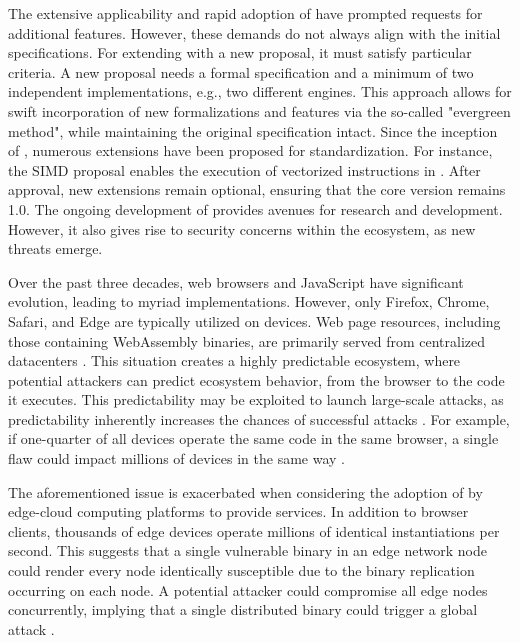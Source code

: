 The extensive applicability and rapid adoption of \Wasm have prompted requests for additional features. 
However, these demands do not always align with the initial specifications. 
For extending \Wasm with a new proposal, it must satisfy particular criteria.
A new proposal needs a formal specification and a minimum of two independent implementations, e.g., two different \Wasm engines. 
This approach allows for swift incorporation of new formalizations and features via the so-called "evergreen method", while maintaining the original \Wasm specification intact. 
Since the inception of \Wasm, numerous extensions have been proposed for standardization. 
For instance, the SIMD proposal enables the execution of vectorized instructions in \Wasm. 
After approval, new extensions remain optional, ensuring that the core \Wasm version remains 1.0. 
The ongoing development of \Wasm provides avenues for research and development. 
However, it also gives rise to security concerns within the ecosystem, as new threats emerge.


Over the past three decades, web browsers and JavaScript have significant evolution, leading to myriad implementations. 
However, only Firefox, Chrome, Safari, and Edge are typically utilized on devices. 
Web page resources, including those containing WebAssembly binaries, are primarily served from centralized datacenters \cite{STRAC}. 
This situation creates a highly predictable ecosystem, where potential attackers can predict ecosystem behavior, from the browser to the code it executes. 
This predictability may be exploited to launch large-scale attacks, as predictability inherently increases the chances of successful attacks \cite{MTDNationalCyberLaep}. 
For example, if one-quarter of all devices operate the same code in the same browser, a single flaw could impact millions of devices in the same way \cite{goth2003addressing}. 

The aforementioned issue is exacerbated when considering the adoption of \Wasm by edge-cloud computing platforms to provide services. 
In addition to browser clients, thousands of edge devices operate millions of identical \Wasm instantiations per second. 
This suggests that a single vulnerable \Wasm binary in an edge network node could render every node identically susceptible due to the binary replication occurring on each node.
A potential attacker could compromise all edge nodes concurrently, implying that a single distributed \Wasm binary could trigger a global attack .
 



